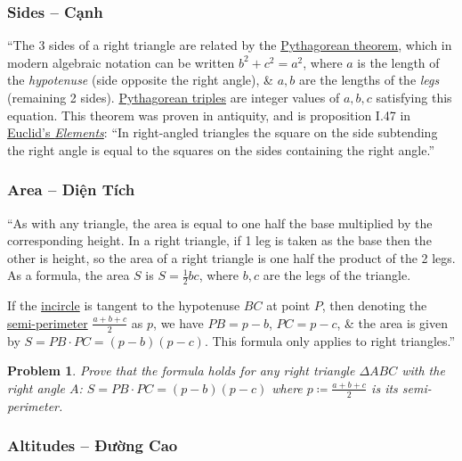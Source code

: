 \documentclass{article}
\newtheorem{problem}{Problem}
\begin{document}
\subsubsection{Sides -- Cạnh}
``The 3 sides of a right triangle are related by the \href{https://en.wikipedia.org/wiki/Pythagorean_theorem}{Pythagorean theorem}, which in modern algebraic notation can be written $b^2 + c^2 = a^2$, where $a$ is the length of the \textit{hypotenuse} (side opposite the right angle), \& $a,b$ are the lengths of the \textit{legs} (remaining 2 sides). \href{https://en.wikipedia.org/wiki/Pythagorean_triple}{Pythagorean triples} are integer values of $a,b,c$ satisfying this equation. This theorem was proven in antiquity, and is proposition I.47 in \href{https://en.wikipedia.org/wiki/Euclid%27s_Elements}{Euclid's \textit{Elements}}: ``In right-angled triangles the square on the side subtending the right angle is equal to the squares on the sides containing the right angle.''

\subsubsection{Area -- Diện Tích}
``As with any triangle, the area is equal to one half the base multiplied by the corresponding height. In a right triangle, if 1 leg is taken as the base then the other is height, so the area of a right triangle is one half the product of the 2 legs. As a formula, the area $S$ is $S = \frac{1}{2}bc$, where $b,c$ are the legs of the triangle.

If the \href{https://en.wikipedia.org/wiki/Incircle_and_excircles_of_a_triangle}{incircle} is tangent to the hypotenuse $BC$ at point $P$, then denoting the \href{https://en.wikipedia.org/wiki/Semi-perimeter}{semi-perimeter} $\frac{a + b + c}{2}$ as $p$, we have $PB = p - b$, $PC = p - c$, \& the area is given by $S = PB\cdot PC = (p - b)(p - c)$. This formula only applies to right triangles.''

\begin{problem}
	Prove that the formula holds for any right triangle $\Delta ABC$ with the right angle $A$: $S = PB\cdot PC = (p - b)(p - c)$ where $p\coloneqq\frac{a + b + c}{2}$ is its semi-perimeter.
\end{problem}

\subsubsection{Altitudes -- Đường Cao}
\end{document}

